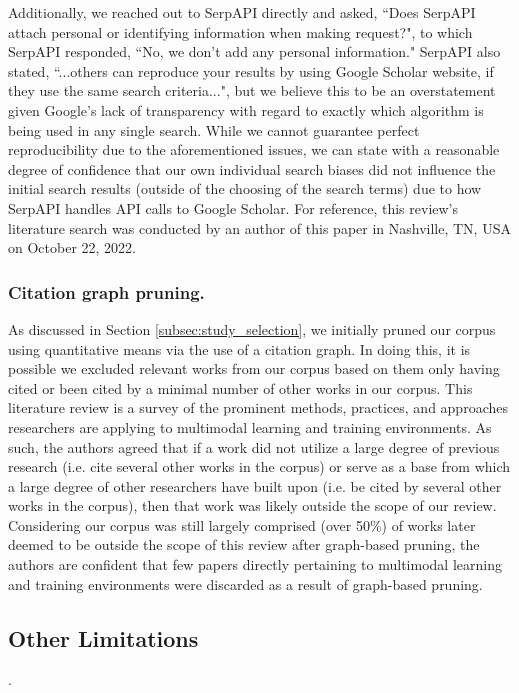 \documentclass[manuscript,screen,review]{acmart}
\begin{document}
Additionally, we reached out to SerpAPI directly and asked, ``Does SerpAPI attach personal or identifying information when making request?", to which SerpAPI responded, ``No, we don't add any personal information." SerpAPI also stated, ``...others can reproduce your results by using Google Scholar website, if they use the same search criteria...", but we believe this to be an overstatement given Google's lack of transparency with regard to exactly which algorithm is being used in any single search. While we cannot guarantee perfect reproducibility due to the aforementioned issues, we can state with a reasonable degree of confidence that our own individual search biases did not influence the initial search results (outside of the choosing of the search terms) due to how SerpAPI handles API calls to Google Scholar. For reference, this review's literature search was conducted by an author of this paper in Nashville, TN, USA on October 22, 2022.

\subsubsection{Citation graph pruning.} 

As discussed in Section \ref{subsec:study_selection}, we initially pruned our corpus using quantitative means via the use of a citation graph. In doing this, it is possible we excluded relevant works from our corpus based on them only having cited or been cited by a minimal number of other works in our corpus. This literature review is a survey of the prominent methods, practices, and approaches researchers are applying to multimodal learning and training environments. As such, the authors agreed that if a work did not utilize a large degree of previous research (i.e. cite several other works in the corpus) or serve as a base from which a large degree of other researchers have built upon (i.e. be cited by several other works in the corpus), then that work was likely outside the scope of our review. Considering our corpus was still largely comprised (over 50\%) of works later deemed to be outside the scope of this review after graph-based pruning, the authors are confident that few papers directly pertaining to multimodal learning and training environments were discarded as a result of graph-based pruning.

\subsection{Other Limitations}.
\end{document}
